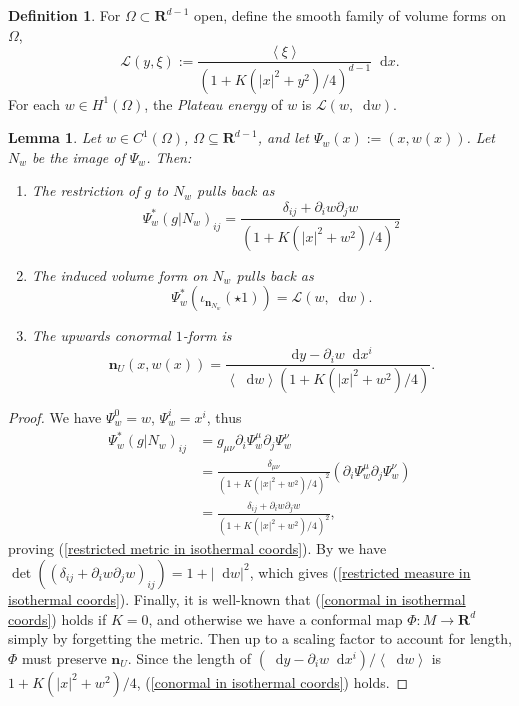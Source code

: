 \documentclass[reqno,10pt]{amsart}
\newcommand{\RR}{\mathbf{R}}
\newcommand*\dif{\mathop{}\!\mathrm{d}}
\newcommand{\Lagrange}{\mathscr L}
\newcommand{\normal}{\mathbf n}
\newcommand{\dfn}[1]{\emph{#1}\index{#1}}
\def\Japan#1{\left \langle #1 \right \rangle}
\newtheorem{lemma}[theorem]{Lemma}
\theoremstyle{definition}
\newtheorem{definition}[theorem]{Definition}
\numberwithin{equation}{section}
\begin{document}
\begin{definition}
For $\Omega \subset \RR^{d - 1}$ open, define the smooth family of volume forms on $\Omega$,
$$\Lagrange(y, \xi) := \frac{\Japan{\xi}}{(1 + K(|x|^2 + y^2)/4)^{d - 1}} \dif x.$$
For each $w \in H^1(\Omega)$, the \dfn{Plateau energy} of $w$ is $\Lagrange(w, \dif w)$.
\end{definition}

\begin{lemma}\label{Plateau setup lemma}
Let $w \in C^1(\Omega)$, $\Omega \subseteq \RR^{d - 1}$, and let $\Psi_w(x) := (x, w(x))$. Let $N_w$ be the image of $\Psi_w$. Then:
\begin{enumerate}
\item The restriction of $g$ to $N_w$ pulls back as
\begin{equation}\label{restricted metric in isothermal coords}
\Psi_w^*(g|N_w)_{ij} = \frac{\delta_{ij} + \partial_i w \partial_j w}{(1 + K(|x|^2 + w^2)/4)^2}
\end{equation}
\item The induced volume form on $N_w$ pulls back as
\begin{equation}\label{restricted measure in isothermal coords}
\Psi_w^*(\iota_{\normal_{N_w}}(\star 1)) = \Lagrange(w, \dif w).
\end{equation}
\item The upwards conormal $1$-form is
\begin{equation}\label{conormal in isothermal coords}
\normal_U(x, w(x)) = \frac{\dif y - \partial_i w \dif x^i}{\Japan{\dif w}(1 + K(|x|^2 + w^2)/4)}.
\end{equation}
\end{enumerate}
\end{lemma}
\begin{proof}
We have $\Psi_w^0 = w$, $\Psi_w^i = x^i$, thus
\begin{align*}
\Psi_w^*(g|N_w)_{ij} &= g_{\mu\nu} \partial_i \Psi_w^\mu \partial_j \Psi_w^\nu \\
&= \frac{\delta_{\mu\nu}}{(1 + K(|x|^2 + w^2)/4)^2} (\partial_i \Psi_w^\mu \partial_j \Psi_w^\nu) \\
&= \frac{\delta_{ij} + \partial_i w \partial_j w}{(1 + K(|x|^2 + w^2)/4)^2},
\end{align*}
proving (\ref{restricted metric in isothermal coords}).
By \cite[(24)]{Petersen2008} we have $\det((\delta_{ij} + \partial_i w \partial_j w)_{ij}) = 1 + |\dif w|^2$, which gives (\ref{restricted measure in isothermal coords}).
Finally, it is well-known that (\ref{conormal in isothermal coords}) holds if $K = 0$, and otherwise we have a conformal map $\Phi: M \to \RR^d$ simply by forgetting the metric.
Then up to a scaling factor to account for length, $\Phi$ must preserve $\normal_U$.
Since the length of $(\dif y - \partial_i w \dif x^i)/\Japan{\dif w}$ is $1 + K(|x|^2 + w^2)/4$, (\ref{conormal in isothermal coords}) holds.
\end{proof}
\end{document}

